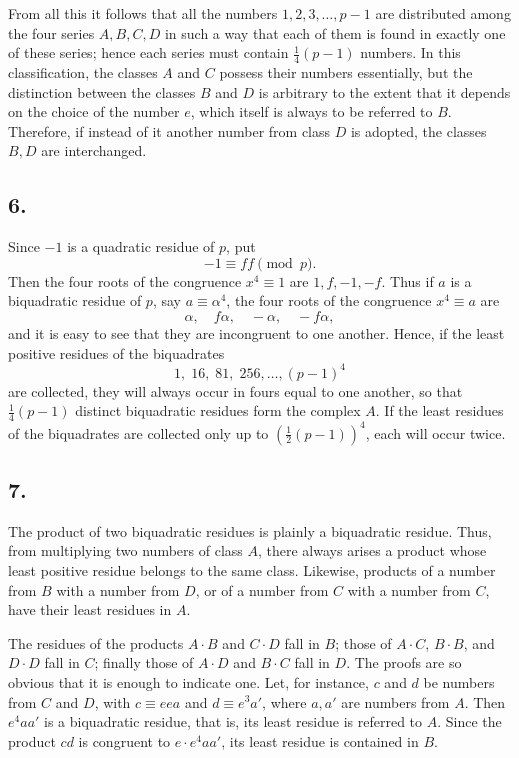 \documentclass[12pt]{article}
\begin{document}
From all this it follows that all the numbers $1,2,3,\ldots,p-1$ are distributed among the four series $A,B,C,D$ in such a way that each of them is found in exactly one of these series; hence each series must contain $\frac14(p-1)$ numbers. In this classification, the classes $A$ and $C$ possess their numbers essentially, but the distinction between the classes $B$ and $D$ is arbitrary to the extent that it depends on the choice of the number $e$, which itself is always to be referred to $B$. Therefore, if instead of it another number from class $D$ is adopted, the classes $B,D$ are interchanged.

\subsection*{6.}

Since $-1$ is a quadratic residue of $p$, put
\[
-1\equiv ff\pmod p.
\]
Then the four roots of the congruence $x^4\equiv1$ are $1,f,-1,-f$. Thus if $a$ is a biquadratic residue of $p$, say $a\equiv\alpha^4$, the four roots of the congruence $x^4\equiv a$ are
\[
\alpha,\quad f\alpha,\quad -\alpha,\quad -f\alpha,
\]
and it is easy to see that they are incongruent to one another. Hence, if the least positive residues of the biquadrates
\[
1,\;16,\;81,\;256,\ldots,(p-1)^4
\]
are collected, they will always occur in fours equal to one another, so that $\frac14(p-1)$ distinct biquadratic residues form the complex $A$. If the least residues of the biquadrates are collected only up to $\left(\frac12(p-1)\right)^4$, each will occur twice.

\subsection*{7.}

The product of two biquadratic residues is plainly a biquadratic residue. Thus, from multiplying two numbers of class $A$, there always arises a product whose least positive residue belongs to the same class. Likewise, products of a number from $B$ with a number from $D$, or of a number from $C$ with a number from $C$, have their least residues in $A$.

The residues of the products $A\cdot B$ and $C\cdot D$ fall in $B$; those of $A\cdot C$, $B\cdot B$, and $D\cdot D$ fall in $C$; finally those of $A\cdot D$ and $B\cdot C$ fall in $D$. The proofs are so obvious that it is enough to indicate one. Let, for instance, $c$ and $d$ be numbers from $C$ and $D$, with $c\equiv eea$ and $d\equiv e^3a'$, where $a,a'$ are numbers from $A$. Then $e^4aa'$ is a biquadratic residue, that is, its least residue is referred to $A$. Since the product $cd$ is congruent to $e\cdot e^4aa'$, its least residue is contained in $B$.
\end{document}
